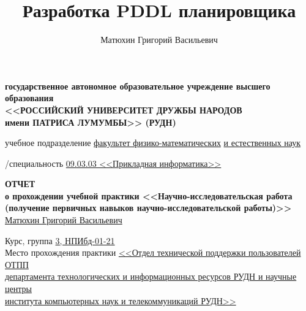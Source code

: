 \documentclass{article}
\title{Разработка PDDL планировщика}
\author{Матюхин Григорий Васильевич}
\begin{document}
\begin{titlepage}
    \setlength{\parindent}{0cm}
    
    \begin{center}
    \hfill \break 
    \textbf{
     государственное автономное образовательное учреждение высшего образования\\
    \normalsize<<РОССИЙСКИЙ УНИВЕРСИТЕТ ДРУЖБЫ НАРОДОВ\\ имени ПАТРИСА ЛУМУМБЫ>> (РУДН)
    }
    \vspace{1cm}

    \begin{paracol}{2}
       учебное подразделение
      \switchcolumn
      \underline{факультет физико-математических}
      \underline{и естественных наук}
    \end{paracol}

    \vspace{0.5em}

    \begin{paracol}{2}
      /специальность
      \switchcolumn
      \underline{09.03.03 <<Прикладная информатика>>}
      \end{paracol}
    \centering
    
    \vspace*{\fill}
    
    \textbf{ОТЧЕТ} \\
    \vspace{1em}
    \textbf{о прохождении учебной практики <<Научно-исследовательская работа\\ (получение первичных навыков научно-исследовательской работы)>>}
    \\ \vspace{5mm}
    \normalsize{\underline{Матюхин Григорий Васильевич}}
    \vspace{1em}
    \end{center}
    
    Курс, группа \underline{3, НПИбд-01-21} \\

    Место прохождения практики 
    \underline{<<Отдел технической поддержки пользователей ОТПП}\\
    \underline{департамента технологических и информационных ресурсов РУДН и научные центры}\\
    \underline{института компьютерных наук и телекоммуникаций РУДН>>} \\


\end{titlepage}
\end{document}

